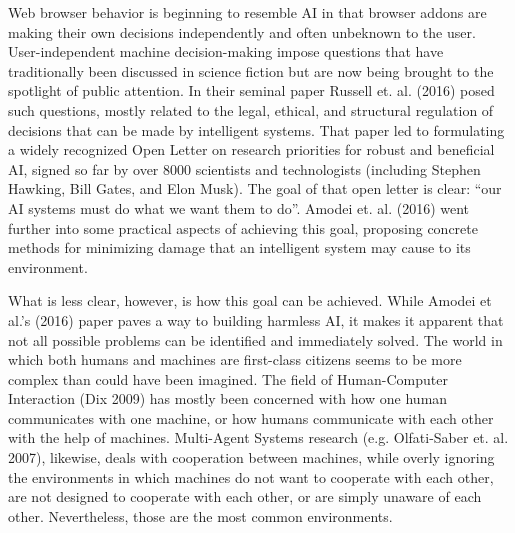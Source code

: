 \documentclass{article} %
\begin{document}
 

Web browser behavior is beginning to resemble AI in that browser addons are making their own decisions independently and often unbeknown to the user. User-independent machine decision-making impose questions that have traditionally been discussed in science fiction but are now being brought to the spotlight of public attention. In their seminal paper Russell et. al. (2016) posed such questions, mostly related to the legal, ethical, and structural regulation of decisions that can be made by intelligent systems. That paper led to formulating a widely recognized Open Letter on research priorities for robust and beneficial AI, signed so far by over 8000 scientists and technologists (including Stephen Hawking, Bill Gates, and Elon Musk). The goal of that open letter is clear: ``our AI systems must do what we want them to do''. Amodei et. al. (2016) went further into some practical aspects of achieving this goal, proposing concrete methods for minimizing damage that an intelligent system may cause to its environment. 

What is less clear, however, is how this goal can be achieved. While Amodei et al.'s (2016) paper paves a way to building harmless AI, it makes it apparent that not all possible problems can be identified and immediately solved. The world in which both humans and machines are first-class citizens seems to be more complex than could have been imagined. The field of Human-Computer Interaction (Dix 2009) has mostly been concerned with how one human communicates with one machine, or how humans communicate with each other with the help of machines. Multi-Agent Systems research (e.g. Olfati-Saber et. al. 2007), likewise, deals with cooperation between machines, while overly ignoring the environments in which machines do not want to cooperate with each other, are not designed to cooperate with each other, or are simply unaware of each other. Nevertheless, those are the most common environments.
\end{document}
